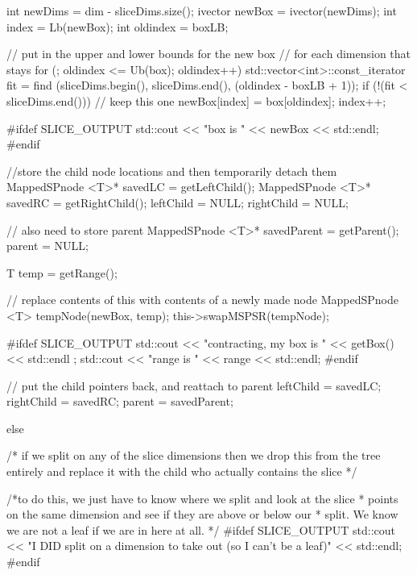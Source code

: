 \begin{DoxyCode}
{{      int newDims = dim - sliceDims.size();
      ivector newBox = ivector(newDims); 
      int index = Lb(newBox);
      int oldindex = boxLB;
    
      // put in the upper and lower bounds for the new box
      // for each dimension that stays  
      for (; oldindex <= Ub(box); oldindex++) {
        std::vector<int>::const_iterator fit 
        = find (sliceDims.begin(), sliceDims.end(), (oldindex - boxLB + 1));
        if (!(fit < sliceDims.end())) { // keep this one
          newBox[index] = box[oldindex];
          index++;
        }
      }
      
      #ifdef SLICE_OUTPUT
        std::cout << "\tnew box is " << newBox << std::endl;
      #endif
      
      //store the child node locations and then temporarily detach them
      MappedSPnode <T>* savedLC = getLeftChild();
      MappedSPnode <T>* savedRC = getRightChild();
      leftChild = NULL;
      rightChild = NULL;
      
      // also need to store parent
      MappedSPnode <T>* savedParent = getParent();
      parent = NULL;
      
      T temp = getRange();
      
      // replace contents of this with contents of a newly made node  
      MappedSPnode <T> tempNode(newBox, temp);
      this->swapMSPSR(tempNode);
      
      #ifdef SLICE_OUTPUT
        std::cout << "\tafter contracting, my box is " << getBox() << std::endl
      ;
        std::cout << "\n\tmy range is " << range << std::endl;
      #endif
      
      // put the child pointers back, and reattach to parent
      leftChild = savedLC;
      rightChild = savedRC;
      parent = savedParent;
      
    }
    else {
    
      /* if we split on any of the slice dimensions
         then we drop this from the tree entirely and
         replace it with the child who actually contains the slice */
        
      /*to do this, we just have to know where we split and look at the slice
       * points on the same dimension and see if they are above or below our
       * split. We know we are not a leaf if we are in here at all.  */
      #ifdef SLICE_OUTPUT
        std::cout << "I DID split on a dimension to take out (so I can't be a
       leaf)" << std::endl;
      #endif 
      
}}
\end{DoxyCode}
